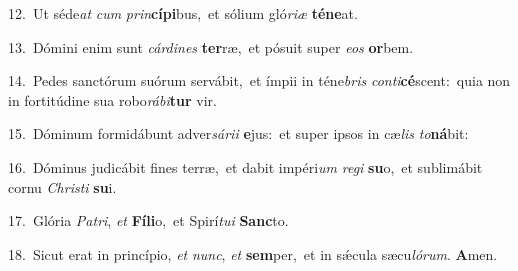 {\numbfont\textcolor{\numbcolor}{12.}}~Ut séde\textit{at} \textit{cum} \textit{prin}\-\textbf{cí}\textbf{pi}bus,~\star et sólium gló\-\textit{ri}\-\textit{æ} \textbf{té}\-\textbf{ne}at.\par
{\numbfont\textcolor{\numbcolor}{13.}}~Dómini enim sunt \textit{cár}\-\textit{di}\textit{nes} \textbf{ter}\-ræ,~\star et pósuit super \textit{e}\-\textit{os} \textbf{or}\-bem.\par
{\numbfont\textcolor{\numbcolor}{14.}}~Pedes sanctórum suórum servábit,~\dagger et ímpii in téne\textit{bris} \textit{con}\-\textit{ti}\textbf{cé}scent:~\star quia non in fortitúdine sua robo\-\textit{rá}\-\textit{bi}\textbf{tur} vir.\par
{\numbfont\textcolor{\numbcolor}{15.}}~Dóminum formidábunt adver\-\textit{sá}\-\textit{ri}\textit{i} \textbf{e}\-jus:~\star et super ipsos in cæ\textit{lis} \textit{to}\-\textbf{ná}bit:\par
{\numbfont\textcolor{\numbcolor}{16.}}~Dóminus judicábit fines terræ,~\dagger et dabit impéri\textit{um} \textit{re}\-\textit{gi} \textbf{su}\-o,~\star et sublimábit cornu \textit{Chris}\-\textit{ti} \textbf{su}\-i.\par
{\numbfont\textcolor{\numbcolor}{17.}}~Glória \textit{Pa}\-\textit{tri}, \textit{et} \textbf{Fí}\-\textbf{li}o,~\star et Spirí\-\textit{tu}\-\textit{i} \textbf{Sanc}\-to.\par
{\numbfont\textcolor{\numbcolor}{18.}}~Sicut erat in princípio, \textit{et} \textit{nunc}\-, \textit{et} \textbf{sem}\-per,~\star et in sǽcula sæcu\-\textit{ló}\-\textit{rum}. \textbf{A}\-men.\par
